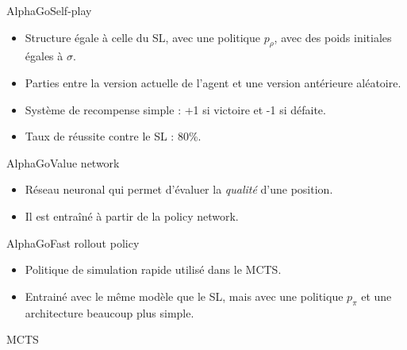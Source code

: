 \begin{frame}{AlphaGo}{Self-play}

	\begin{itemize}
		\item Structure égale à celle du SL, avec une politique $p_\rho$, avec des poids initiales égales à $\sigma$.
		\item Parties entre la version actuelle de l'agent et une version antérieure aléatoire.
		\item Système de recompense simple : +1 si victoire et -1 si défaite.
		\item Taux de réussite contre le SL : 80\%.
	\end{itemize}

\end{frame}


\begin{frame}{AlphaGo}{Value network}
	\begin{itemize}
		\item Réseau neuronal qui permet d'évaluer la \textit{qualité} d'une position.
		\item Il est entraîné à partir de la policy network.
	\end{itemize}
\end{frame}

\begin{frame}{AlphaGo}{Fast rollout policy}
	\begin{itemize}
		\item Politique de simulation rapide utilisé dans le MCTS.
		\item Entrainé avec le même modèle que le SL, mais avec une politique $p_\pi$ et une architecture beaucoup plus simple.
	\end{itemize}

\end{frame}


\begin{frame}{MCTS}

\end{frame}
